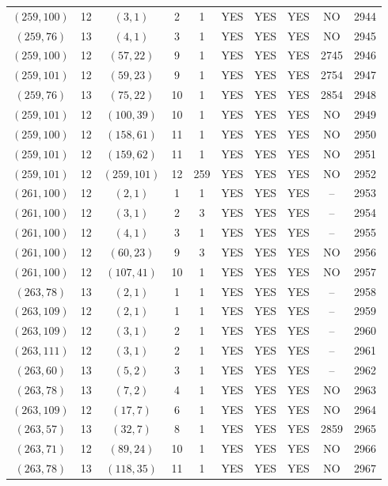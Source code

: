 \begin{longtable}{|c|c|c|c|c|c|c|c|c|c|}
$(259, 100)$ & 12 & $(3, 1)$ & 2 & 1 & YES & YES & YES & NO & 2944\\
$(259, 76)$ & 13 & $(4, 1)$ & 3 & 1 & YES & YES & YES & NO & 2945\\
$(259, 100)$ & 12 & $(57, 22)$ & 9 & 1 & YES & YES & YES & 2745 & 2946\\
$(259, 101)$ & 12 & $(59, 23)$ & 9 & 1 & YES & YES & YES & 2754 & 2947\\
$(259, 76)$ & 13 & $(75, 22)$ & 10 & 1 & YES & YES & YES & 2854 & 2948\\
$(259, 101)$ & 12 & $(100, 39)$ & 10 & 1 & YES & YES & YES & NO & 2949\\
$(259, 100)$ & 12 & $(158, 61)$ & 11 & 1 & YES & YES & YES & NO & 2950\\
$(259, 101)$ & 12 & $(159, 62)$ & 11 & 1 & YES & YES & YES & NO & 2951\\
$(259, 101)$ & 12 & $(259, 101)$ & 12 & 259 & YES & YES & YES & NO & 2952\\
$(261, 100)$ & 12 & $(2, 1)$ & 1 & 1 & YES & YES & YES & -- & 2953\\
$(261, 100)$ & 12 & $(3, 1)$ & 2 & 3 & YES & YES & YES & -- & 2954\\
$(261, 100)$ & 12 & $(4, 1)$ & 3 & 1 & YES & YES & YES & -- & 2955\\
$(261, 100)$ & 12 & $(60, 23)$ & 9 & 3 & YES & YES & YES & NO & 2956\\
$(261, 100)$ & 12 & $(107, 41)$ & 10 & 1 & YES & YES & YES & NO & 2957\\
$(263, 78)$ & 13 & $(2, 1)$ & 1 & 1 & YES & YES & YES & -- & 2958\\
$(263, 109)$ & 12 & $(2, 1)$ & 1 & 1 & YES & YES & YES & -- & 2959\\
$(263, 109)$ & 12 & $(3, 1)$ & 2 & 1 & YES & YES & YES & -- & 2960\\
$(263, 111)$ & 12 & $(3, 1)$ & 2 & 1 & YES & YES & YES & -- & 2961\\
$(263, 60)$ & 13 & $(5, 2)$ & 3 & 1 & YES & YES & YES & -- & 2962\\
$(263, 78)$ & 13 & $(7, 2)$ & 4 & 1 & YES & YES & YES & NO & 2963\\
$(263, 109)$ & 12 & $(17, 7)$ & 6 & 1 & YES & YES & YES & NO & 2964\\
$(263, 57)$ & 13 & $(32, 7)$ & 8 & 1 & YES & YES & YES & 2859 & 2965\\
$(263, 71)$ & 12 & $(89, 24)$ & 10 & 1 & YES & YES & YES & NO & 2966\\
$(263, 78)$ & 13 & $(118, 35)$ & 11 & 1 & YES & YES & YES & NO & 2967\\

\end{longtable}
